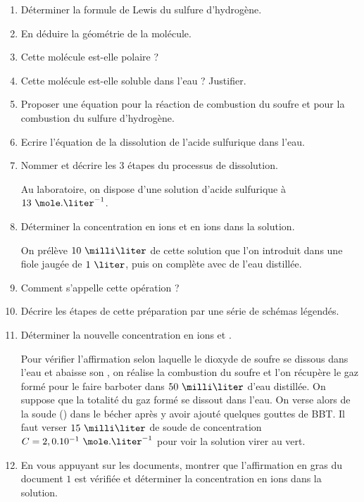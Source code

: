 \begin{enumerate}
\item Déterminer la formule de Lewis du sulfure d'hydrogène.
\item En déduire la géométrie de la molécule.
\item Cette molécule est-elle polaire ?
\item Cette molécule est-elle soluble dans l'eau ? Justifier.
\item Proposer une équation pour la réaction de combustion du soufre et pour la combustion du sulfure d'hydrogène.
\item Ecrire l'équation de la dissolution de l'acide sulfurique dans l'eau.
\item Nommer et décrire les $3$ étapes du processus de dissolution.

\vspace{0.3cm}

Au laboratoire, on dispose d'une solution d'acide sulfurique à $13\text{ }\mole.\liter^{-1}$.

\item Déterminer la concentration en ions  et en ions  dans la solution.

\vspace{0.3cm}

On prélève $10\text{ }\milli\liter$ de cette solution que l'on introduit dans une fiole jaugée de $1\text{ }\liter$, puis on complète avec de l'eau distillée.

\item Comment s'appelle cette opération ?

\item Décrire les étapes de cette préparation par une série de schémas légendés.

\item Déterminer la nouvelle concentration en ions  et .

\vspace{0.3cm}

Pour vérifier l'affirmation selon laquelle le dioxyde de soufre se dissous dans l'eau et abaisse son , on réalise la combustion du soufre et l'on récupère le gaz formé pour le faire barboter dans $50\text{ }\milli\liter$ d'eau distillée. On suppose que la totalité du gaz formé se dissout dans l'eau.\newline
On verse alors de la soude () dans le bécher après y avoir ajouté quelques gouttes de BBT. Il faut verser $15\text{ }\milli\liter$ de soude de concentration $C = 2,0 . 10^{-1}\text{ }\mole.\liter^{-1}$ pour voir la solution virer au vert.

\item En vous appuyant sur les documents, montrer que l'affirmation en gras du document $1$ est vérifiée et déterminer la concentration en ions  dans la solution.

\end{enumerate}

